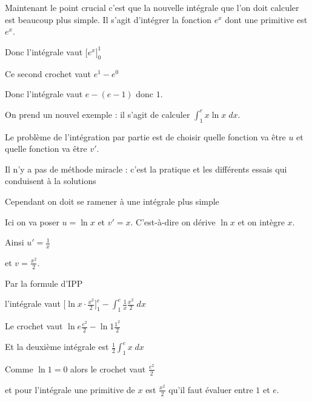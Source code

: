 Maintenant le point crucial c'est que la nouvelle intégrale que l'on doit calculer est beaucoup plus simple.
Il s'agit d'intégrer la fonction $e^x$ dont une primitive est $e^x$.

Donc l'intégrale vaut $\big[e^x\big]_0^1$

\change

Ce second crochet vaut $e^1-e^0$

\change

Donc l'intégrale vaut 
$e-(e-1)$ donc $1$.


\diapo

On prend un nouvel exemple : il s'agit de calculer  $\int_1^e x\ln x \; dx$.


Le problème de l'intégration par partie est de choisir quelle fonction va être $u$ et quelle fonction
va être $v'$. 

\change

\change

Il n'y a pas de méthode miracle : c'est la pratique et les différents essais
qui conduisent à la solutions 

\change

Cependant on doit se ramener à une intégrale plus simple 


Ici on va poser $u=\ln x$ et $v'=x$.
C'est-à-dire on dérive $\ln x$ et on intègre $x$.


\change

Ainsi 
$u'=\frac1x$ 

\change

et $v=\frac{x^2}{2}$.

\change

Par la formule d'IPP 

\change

l'intégrale vaut 
$\big[\ln x \cdot\tfrac{x^2}{2}\big]_1^e - \int_1^e \tfrac 1x \tfrac{x^2}{2} \; dx$

\change

Le crochet vaut $\ln e \tfrac{e^2}{2} - \ln 1 \tfrac{1^2}{2}$ 

\change

Et la deuxième intégrale est $\tfrac12 \int_1^e x  \; dx $

\change

Comme $\ln 1=0$ alors le crochet vaut $\tfrac{e^2}{2}$


et pour l'intégrale une primitive de $x$ est $\frac{x^2}{2}$ qu'il faut évaluer entre $1$ et $e$.

\change

